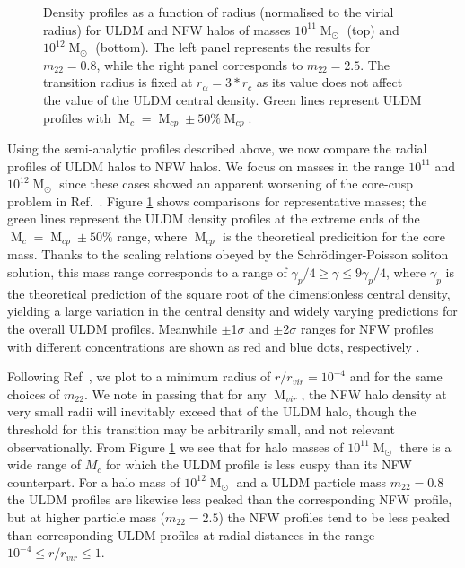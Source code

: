 \documentclass[a4paper,11pt]{article}
\begin{document}
\begin{figure}
\begin{tabular}{cc}
\end{tabular}
\caption{Density profiles as a function of radius (normalised to the virial radius) for ULDM and NFW halos of masses $10^{11}\operatorname{M}_{\odot}$ (top) and $10^{12}\operatorname{M}_{\odot}$ (bottom). The left panel represents the results for $m_{22} = 0.8$, while the right panel corresponds to $m_{22}=2.5$. The transition radius is fixed at $r_{\alpha} = 3*r_c$ as its value does not affect the value of the ULDM central density. Green lines represent  ULDM profiles with $\operatorname{M}_c = \operatorname{M}_{cp} \pm 50 \% \operatorname{M}_{cp}$.}\label{fig:profiles}
\end{figure}

 
Using the semi-analytic profiles described above, we now compare the radial profiles of ULDM halos to NFW halos. We focus on masses in the range $10^{11}$ and $10^{12} \operatorname{M}_{\odot}$ since these cases showed an apparent worsening of the core-cusp problem in Ref.~\cite{Robles:2018fur}. Figure \ref{fig:profiles} shows comparisons for representative masses; the green lines represent the ULDM density profiles at the extreme ends of the $\operatorname{M}_c = \operatorname{M}_{cp} \pm 50 \% $ range, where $\operatorname{M}_{cp}$ is the theoretical predicition for the core mass. Thanks to the scaling relations obeyed by the Schr{\"o}dinger-Poisson soliton solution, this mass range corresponds to a range of $ \gamma_p /4 \geq \gamma \leq 9\gamma_p/4$, where $\gamma_p$ is the theoretical prediction of the square root of the dimensionless central density, yielding a large variation in the central density and widely varying predictions for the overall ULDM profiles. Meanwhile $\pm$1$\sigma$ and $\pm$2$\sigma$ ranges for NFW profiles with different concentrations are shown as red and blue dots, respectively \cite{Maccio:2008pcd}. 

Following Ref~\cite{Robles:2018fur}, we plot to a minimum radius of $r/r_{vir} = 10^{-4}$ and for the same choices of $m_{22}$. We note in passing that for any $\operatorname{M}_{vir}$, the NFW halo density at very small radii will inevitably exceed that of the ULDM halo, though the threshold for this transition may be arbitrarily small, and not relevant observationally.  From Figure \ref{fig:profiles} we see that for halo masses of $10^{11}\operatorname{M}_{\odot}$ there is a wide range of $M_c$ for which the ULDM profile is less cuspy than its NFW counterpart.  For a halo mass of $10^{12}\operatorname{M}_{\odot}$ and a ULDM particle mass $m_{22}=0.8$ the ULDM profiles are likewise less peaked than the corresponding NFW profile, but at higher particle mass ($m_{22}=2.5$) the  NFW profiles tend to be less peaked than corresponding ULDM profiles at radial distances in  the range $10^{-4}\leq r/r_{vir} \leq 1$.
\end{document}
